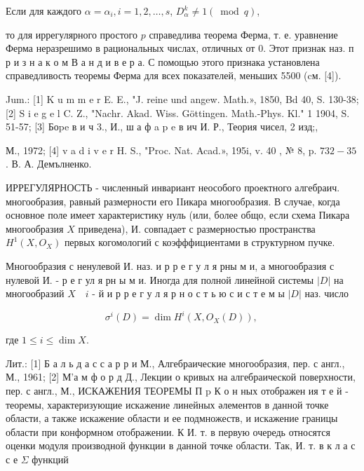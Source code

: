 \documentclass[10pt]{article}
\begin{document}
Если для каждого $\alpha=\alpha_{i}, i=1,2, \ldots, s$, $D_{\alpha}^{k} \neq 1(\bmod q)$,



то для иррегулярного простого $p$ справедлива теорема Ферма, т. е. уравнение Ферма неразрешимо в рациональных числах, отличных от 0. Этот признак наз. п р и з н а к о м В а н д и в е р а. С помощью этого признака установлена справедливость теоремы Ферма для всех показателей, меньших 5500 (cм. [4]).



Jum.: [1] K u m m e r E. E., "J. reine und angew. Math.», 1850, Bd 40, S. 130-38; [2] S i e g e l C. Z., "Nachr. Akad. Wiss. Göttingen. Math.-Phys. Kl." 1 1904, S. 51-57; [3] Боpe в и ч 3., И., ш а ф a p e в ич И. Р., Теория чисел, 2 изд;,

М., 1972; [4] v a d i v e r H. S., "Proc. Nat. Acad.», 195i, v. 40 , № 8, p. $732-35$. В. А. Демълненко.



ИРРЕГУЛЯРНОСТЬ - численный инвариант неособого проектного алгебраич. многообразия, равный размерности его IIикара многообразия. В случае, когда основное поле имеет характеристику нуль (или, более общо, если схема Пикара многообразия $X$ приведена), И. совпадает с размерностью пространства $H^{1}\left(X, O_{X}\right)$ первых когомологий с коэфффициентами в структурном пучке.



Многообразия с ненулевой И. наз. и р р е г у л я рны м и, а многообразия с нулевой И. - р е г ул я рн ы м и. Иногда для полной линейной системы $|D|$ на многообразий $X \quad i$ - й и р р е г у л я р н о с т ь ю с и с т е м ы $|D|$ наз. число



\[

\sigma^{i}(D)=\operatorname{dim} H^{i}\left(X, O_{X}(D)\right) \text {, }

\]



где $1 \leqslant i \leqslant \operatorname{dim} X$.



Лит.: [1] Б а л ь д а с с а р р и М., Алгебраические многообразия, пер. с англ., М., 1961; [2] М'а м ф о р д Д., Лекции о кривых на алгебраической поверхности, пер. с англ., М., ИСКАЖЕНИЯ ТЕОРЕМЫ П $\mathrm{p}$ К $о$ н ных отображен ия т е й - теоремы, характеризующие искажение линейных әлементов в данной точке области, а также искажение области и ее подмножеств, и искажение границы области при конформном отображении. К И. т. в первую очередь относятся оценки модуля производной функции в данной точке области. Так, И. т. в к л а с с е $\Sigma$ функций
\end{document}
